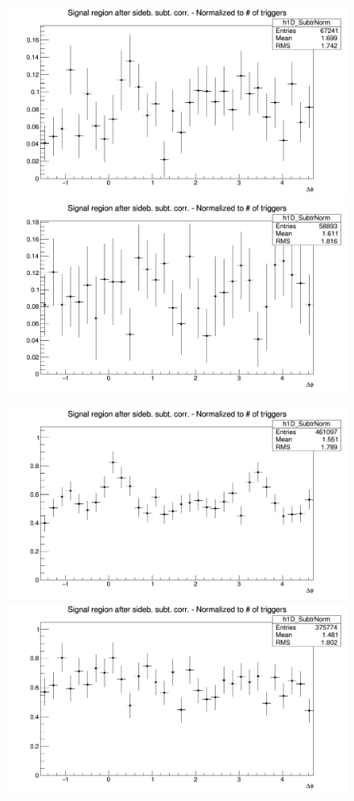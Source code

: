 \begin{figure}[htbp]
\centering

{\includegraphics[width=0.31\linewidth, height=0.23\linewidth]{figures/Dzero/AzimCorrDistr_Dzero_Canvas_PtIntBins3to3_PoolInt_thr2dotto3dot.png}}
{\includegraphics[width=0.31\linewidth, height=0.23\linewidth]{figures/DplusPlotsweff/AzimCorrDistr_Dplus_Canvas_PtIntBins2to2_PoolInt_thr2dotto3dot.png}}

{\includegraphics[width=0.31\linewidth, height=0.23\linewidth]{figures/Dzero/AzimCorrDistr_Dzero_Canvas_PtIntBins3to3_PoolInt_thr1dotto3dot.png}}
{\includegraphics[width=0.31\linewidth, height=0.23\linewidth]{figures/DplusPlotsweff/AzimCorrDistr_Dplus_Canvas_PtIntBins2to2_PoolInt_thr1dotto3dot.png}}


\end{figure}
